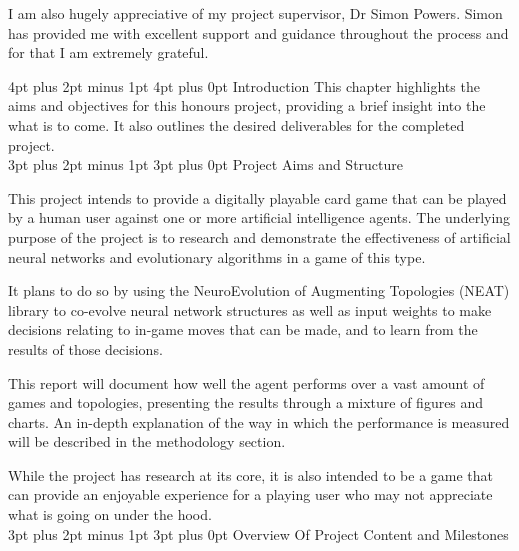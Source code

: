 \documentclass[12pt,a4paper]{article}
\makeatletter
\renewcommand\subsection{\@startsection {subsection}{1}{2mm} %
                               {3pt plus 2pt minus 1pt} %
                               {3pt plus 0pt} %
                               {\normalfont\bfseries}}
\renewcommand\section{\@startsection {section}{1}{0mm} %
                               {4pt plus 2pt minus 1pt} %
                               {4pt plus 0pt} %
                               {\bfseries}}
\makeatother
\begin{document}
I am also hugely appreciative of my project supervisor, Dr Simon Powers. Simon has provided me with excellent support and guidance throughout the process and for that I am extremely grateful.

\newpage
\section{Introduction}
This chapter highlights the aims and objectives for this honours project, providing a brief insight into the what is to come. It also outlines the desired deliverables for the completed project. \\

\subsection{Project Aims and Structure}

This project intends to provide a digitally playable card game that can be played by a human user against one or more artificial intelligence agents. The underlying purpose of the project is to research and demonstrate the effectiveness of artificial neural networks and evolutionary algorithms in a game of this type. 

It plans to do so by using the NeuroEvolution of Augmenting Topologies (NEAT) library to co-evolve neural network structures as well as input weights to make decisions relating to in-game moves that can be made, and to learn from the results of those decisions. 

This report will document how well the agent performs over a vast amount of games and topologies, presenting the results through a mixture of figures and charts. An in-depth explanation of the way in which the performance is measured will be described in the methodology section. 

While the project has research at its core, it is also intended to be a game that can provide an enjoyable experience for a playing user who may not appreciate what is going on under the hood.\\

 \subsection{Overview Of Project Content and Milestones}
\end{document}
